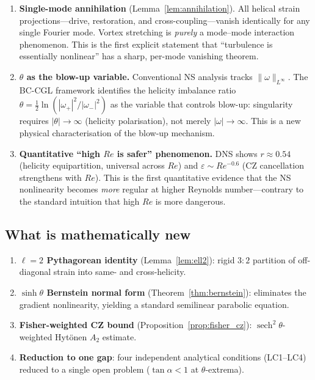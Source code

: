 \documentclass[12pt,a4paper]{article}
\theoremstyle{definition}
\newcommand{\sech}{\operatorname{sech}}
\begin{document}
\begin{enumerate}
\item \textbf{Single-mode annihilation}
(Lemma~\ref{lem:annihilation}).
All helical strain projections---drive, restoration, and
cross-coupling---vanish identically for any single Fourier mode.
Vortex stretching is \emph{purely} a mode--mode interaction phenomenon.
This is the first explicit statement that ``turbulence is essentially
nonlinear'' has a sharp, per-mode vanishing theorem.

\item \textbf{$\theta$ as the blow-up variable.}
Conventional NS analysis tracks $\|\omega\|_{L^\infty}$.
The BC-CGL framework identifies the helicity imbalance ratio
$\theta=\frac{1}{2}\ln(|\omega_+|^2/|\omega_-|^2)$ as the variable
that controls blow-up: singularity requires $|\theta|\to\infty$
(helicity polarisation), not merely $|\omega|\to\infty$.
This is a new physical characterisation of the blow-up mechanism.

\item \textbf{Quantitative ``high $Re$ is safer'' phenomenon.}
DNS shows $r\approx 0.54$ (helicity equipartition, universal across $Re$)
and $\varepsilon\sim Re^{-0.6}$ (CZ cancellation strengthens with $Re$).
This is the first quantitative evidence that the NS nonlinearity
becomes \emph{more} regular at higher Reynolds number---contrary to
the standard intuition that high $Re$ is more dangerous.
\end{enumerate}

\subsection*{What is mathematically new}

\begin{enumerate}
\item \textbf{$\ell=2$ Pythagorean identity} (Lemma~\ref{lem:ell2}):
  rigid $3:2$ partition of off-diagonal strain into same- and
  cross-helicity.
\item \textbf{$\sinh\theta$ Bernstein normal form}
  (Theorem~\ref{thm:bernstein}):
  eliminates the gradient nonlinearity, yielding a standard semilinear
  parabolic equation.
\item \textbf{Fisher-weighted CZ bound}
  (Proposition~\ref{prop:fisher_cz}):
  $\sech^2\theta$-weighted Hyt\"onen $A_2$ estimate.
\item \textbf{Reduction to one gap}: four independent analytical
  conditions (LC1--LC4) reduced to a single open problem
  ($\tan\alpha<1$ at $\theta$-extrema).
\end{enumerate}
\end{document}
